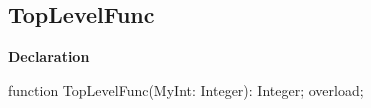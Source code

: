 \documentclass{report}
\newif\ifpdf
\begin{document}
\subsection*{TopLevelFunc}
\fi
\label{ok_link_tag_overloads-TopLevelFunc}
\begin{list}{}{
\setlength{\itemindent}{0cm}
\setlength{\listparindent}{0cm}
\setlength{\leftmargin}{\evensidemargin}
\addtolength{\leftmargin}{\tmplength}
\settowidth{\labelsep}{X}
\addtolength{\leftmargin}{\labelsep}
\setlength{\labelwidth}{\tmplength}
}
\item[\textbf{Declaration}\hfill]
\ifpdf
\begin{flushleft}
\fi
\begin{ttfamily}
function TopLevelFunc(MyInt: Integer): Integer; overload;\end{ttfamily}

\ifpdf
\end{flushleft}
\fi

\end{list}
\end{document}
